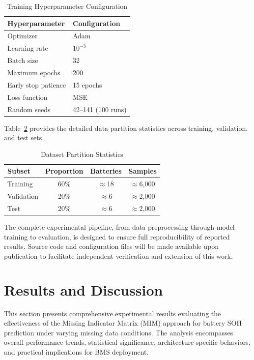 \documentclass[5p,times]{elsarticle}
\begin{document}
\begin{table}[t]
\centering
\footnotesize
\caption{Training Hyperparameter Configuration}
\label{tab:training_config}
\begin{tabular}{@{}lp{3cm}@{}}
\toprule
\textbf{Hyperparameter} & \textbf{Configuration} \\
\midrule
Optimizer & Adam \\
Learning rate & $10^{-3}$ \\
Batch size & 32 \\
Maximum epochs & 200 \\
Early stop patience & 15 epochs \\
Loss function & MSE \\
Random seeds & 42--141 (100 runs) \\
\bottomrule
\end{tabular}
\end{table}

Table~\ref{tab:data_split} provides the detailed data partition statistics across training, validation, and test sets.

\begin{table}[t]
\centering
\footnotesize
\caption{Dataset Partition Statistics}
\label{tab:data_split}
\begin{tabular}{@{}lccc@{}}
\toprule
\textbf{Subset} & \textbf{Proportion} & \textbf{Batteries} & \textbf{Samples} \\
\midrule
Training & 60\% & $\approx$18 & $\approx$6,000 \\
Validation & 20\% & $\approx$6 & $\approx$2,000 \\
Test & 20\% & $\approx$6 & $\approx$2,000 \\
\bottomrule
\end{tabular}
\end{table}

The complete experimental pipeline, from data preprocessing through model training to evaluation, is designed to ensure full reproducibility of reported results. Source code and configuration files will be made available upon publication to facilitate independent verification and extension of this work.

\section{Results and Discussion}\label{sec:results}

This section presents comprehensive experimental results evaluating the effectiveness of the Missing Indicator Matrix (MIM) approach for battery SOH prediction under varying missing data conditions. The analysis encompasses overall performance trends, statistical significance, architecture-specific behaviors, and practical implications for BMS deployment.
\end{document}
